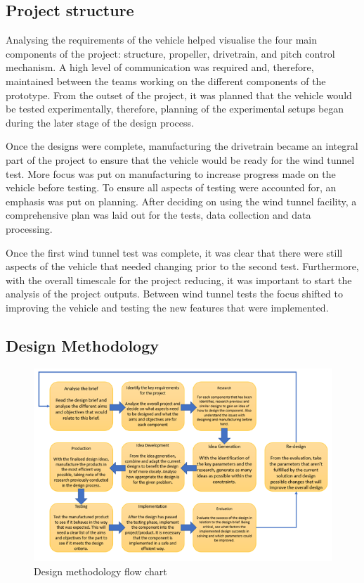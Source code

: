 \subsection{Project structure}

Analysing the requirements of the vehicle helped visualise the four main components of the project: structure, propeller, drivetrain, and pitch control mechanism. A high level of communication was required and, therefore, maintained between the teams working on the different components of the prototype. From the outset of the project, it was planned that the vehicle would be tested experimentally, therefore, planning of the experimental setups began during the later stage of the design process.

Once the designs were complete, manufacturing the drivetrain became an integral part of the project to ensure that the vehicle would be ready for the wind tunnel test. More focus was put on manufacturing to increase progress made on the vehicle before testing. To ensure all aspects of testing were accounted for, an emphasis was put on planning. After deciding on using the wind tunnel facility, a comprehensive plan was laid out for the tests, data collection and data processing.

Once the first wind tunnel test was complete, it was clear that there were still aspects of the vehicle that needed changing prior to the second test. Furthermore, with the overall timescale for the project reducing, it was important to start the analysis of the project outputs. Between wind tunnel tests the focus shifted to improving the vehicle and testing the new features that were implemented.

\subsection{Design Methodology}

\begin{figure}[!htbp]
    \centering
    \includegraphics[width=0.7\linewidth]{images/part2/designMethodology.png}
    \caption{Design methodology flow chart}
    \label{fig:desmeth}
\end{figure}

